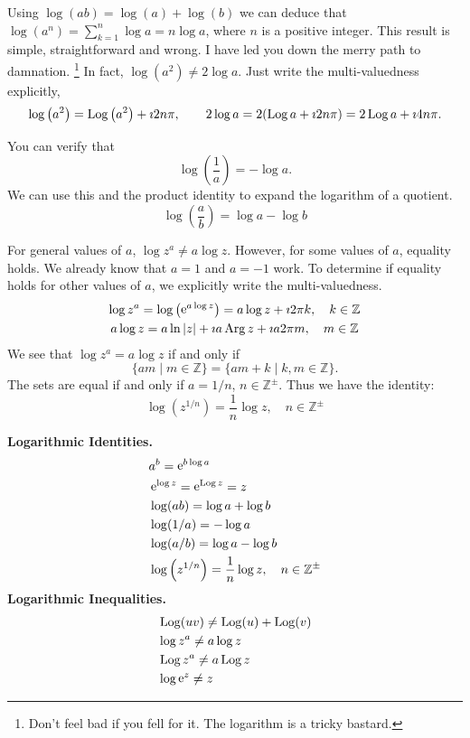 Using $\log(a b) = \log(a) + \log(b)$ we can deduce that
$\log \left( a^n \right) = \sum_{k=1}^n \log a = n \log a$, 
where $n$ is a positive integer.
This result is simple, straightforward and wrong.  I have led you down the
merry path to damnation.%
\footnote{
  Don't feel bad if you fell for it.  The logarithm is a 
  tricky bastard.
  }
In fact, $\log \left( a^2 \right) \neq 2 \log a$.  Just write the multi-valuedness
explicitly,
\[
\log \left( a^2 \right) = \mathop{\mathrm{Log}}\nolimits \left( a^2 \right) + \imath 2 n \pi, \qquad
2 \log a = 2 (\mathop{\mathrm{Log}}\nolimits a + \imath 2 n \pi) = 2 \mathop{\mathrm{Log}}\nolimits a + \imath 4 n \pi.
\]


You can verify that 
\[
\log \left( \frac{1}{a} \right) = - \log a.
\]
We can use this and the product identity to expand the logarithm of 
a quotient.
\[
\log \left( \frac{a}{b} \right) = \log a - \log b
\]


For general values of $a$, $\log z^a \neq a \log z$.  However, for some values of 
$a$, equality holds.  We already know that $a = 1$ and $a = -1$ work.  To
determine if equality holds for other values of $a$, we explicitly write the
multi-valuedness.
\begin{gather*}
  \log z^a = \log \left( \mathop{\mathrm{e}}\nolimits^{a \log z} \right) 
  = a \log z + \imath 2 \pi k, \quad k \in \mathbb{Z} 
  \\
  a \log z = a \ln |z| + \imath a \mathop{\mathrm{Arg}}\nolimits z + \imath a 2 \pi m, \quad m \in \mathbb{Z}
\end{gather*}
We see that $\log z^a = a \log z$ if and only if
\[
\{ a m \mid m \in \mathbb{Z} \} = \{ a m + k \mid k,m \in \mathbb{Z} \}.
\]
The sets are equal if and only if $a = 1/n$, $n \in \mathbb{Z}^\pm$.  Thus we 
have the identity:
\[
\log \left( z^{1/n} \right) = \frac{1}{n} \log z, \quad n \in \mathbb{Z}^\pm 
\]












\begin{Result}
  \textbf{Logarithmic Identities.}
  \begin{align*}
    &a^b = \mathop{\mathrm{e}}\nolimits^{b \log a} 
    \\
    &\mathop{\mathrm{e}}\nolimits^{\log z} = \mathop{\mathrm{e}}\nolimits^{\mathop{\mathrm{Log}}\nolimits z} = z 
    \\
    &\log(a b) = \log a + \log b 
    \\
    &\log(1/a) = - \log a 
    \\
    &\log(a/b) = \log a - \log b 
    \\
    &\log \left( z^{1/n} \right) = \frac{1}{n} \log z, \quad n \in \mathbb{Z}^\pm 
  \end{align*}
  \textbf{Logarithmic Inequalities.}
  \begin{align*}
    &\mathop{\mathrm{Log}}\nolimits(u v) \neq \mathop{\mathrm{Log}}\nolimits(u) + \mathop{\mathrm{Log}}\nolimits(v) 
    \\
    &\log z^a \neq a \log z 
    \\
    &\mathop{\mathrm{Log}}\nolimits z^a \neq a \mathop{\mathrm{Log}}\nolimits z 
    \\
    &\log \mathop{\mathrm{e}}\nolimits^z \neq z 
  \end{align*}
\end{Result}









